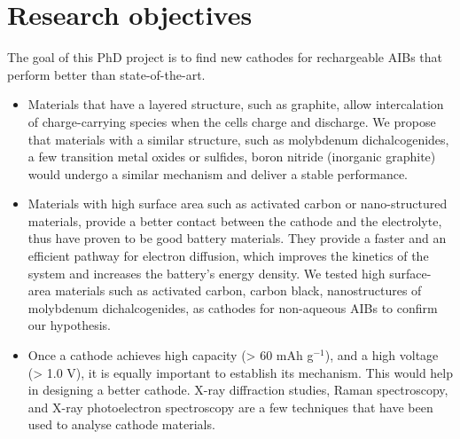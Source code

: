 \section{Research objectives}
The goal of this PhD project is to find new cathodes for rechargeable AIBs that perform better than state-of-the-art. 
\begin{itemize}
    \item Materials that have a layered structure, such as graphite, allow intercalation of charge-carrying species when the cells charge and discharge. We propose that materials with a similar structure, such as molybdenum dichalcogenides, a few transition metal oxides or sulfides, boron nitride (inorganic graphite) would undergo a similar mechanism and deliver a stable performance. 
    
    \item Materials with high surface area such as activated carbon or nano-structured materials, provide a better contact between the cathode and the electrolyte, thus have proven to be good battery materials. They provide a faster and an efficient pathway for electron diffusion, which improves the kinetics of the system and increases the battery's energy density. We tested high surface-area materials such as activated carbon, carbon black, nanostructures of molybdenum dichalcogenides, as cathodes for non-aqueous AIBs to confirm our hypothesis.
    
    \item Once a cathode achieves high capacity (> 60 mAh g$^{-1}$), and a high voltage (> 1.0 V), it is equally important to establish its mechanism. This would help in designing a better cathode. X-ray diffraction studies, Raman spectroscopy, and X-ray photoelectron spectroscopy are a few techniques that have been used to analyse cathode materials. 

\end{itemize}






